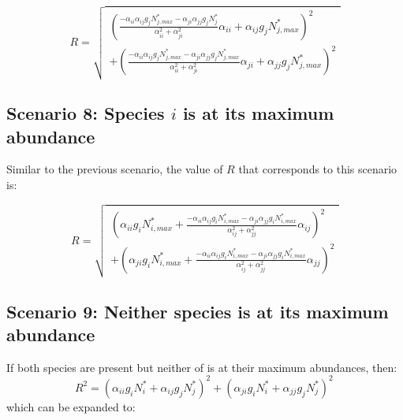 \begin{refsection}
\begin{equation}
  R = \sqrt{
\begin{aligned}
  (\frac{- \alpha_{ii}\alpha_{ij}g_{j}N_{j,max}^{*} - \alpha_{ji}\alpha_{jj}g_{j}N_{j}^{*}}{\alpha_{ii}^2 + \alpha_{ji}^2}\alpha_{ii} + \alpha_{ij}g_{j}N_{j,max}^{*} )^2 \\
  + (\frac{- \alpha_{ii}\alpha_{ij}g_{j}N_{j,max}^{*} - \alpha_{ji}\alpha_{jj}g_{j}N_{j,max}^{*}}{\alpha_{ii}^2 + \alpha_{ji}^2}\alpha_{ji} + \alpha_{jj}g_{j}N_{j,max}^{*} )^2
\end{aligned}
}
\label{scenario7}
\end{equation}



\subsection*{Scenario 8: Species $i$ is at its maximum abundance}

Similar to the previous scenario, the value of $R$ that corresponds to this scenario is:


\begin{equation}
  R = \sqrt{
\begin{aligned}
  (\alpha_{ii}g_{i}N_{i,max}^{*} + \frac{-\alpha_{ii}\alpha_{ij}g_{i}N_{i,max}^{*} - \alpha_{ji}\alpha_{jj}g_{i}N_{i,max}^{*}}{\alpha_{ij}^{2} + \alpha_{jj}^{2}}\alpha_{ij} )^2 \\
  + (\alpha_{ji}g_{i}N_{i,max}^{*} + \frac{-\alpha_{ii}\alpha_{ij}g_{i}N_{i,max}^{*} - \alpha_{ji}\alpha_{jj}g_{i}N_{i,max}^{*}}{\alpha_{ij}^{2} + \alpha_{jj}^{2}}\alpha_{jj} )^2
\end{aligned}
}
\label{scenario8}
\end{equation}


\subsection*{Scenario 9: Neither species is at its maximum abundance}

If both species are present but neither of is at their maximum abundances, then:
\begin{equation}
  R^{2} =  (\alpha_{ii}g_{i}N_{i}^{*} + \alpha_{ij}g_{j}N_{j}^{*}) ^{2} + (\alpha_{ji}g_{i}N_{i}^{*} +\alpha_{jj}g_{j}N_{j}^{*})^{2} \,
\end{equation}
which can be expanded to:


\end{refsection}
